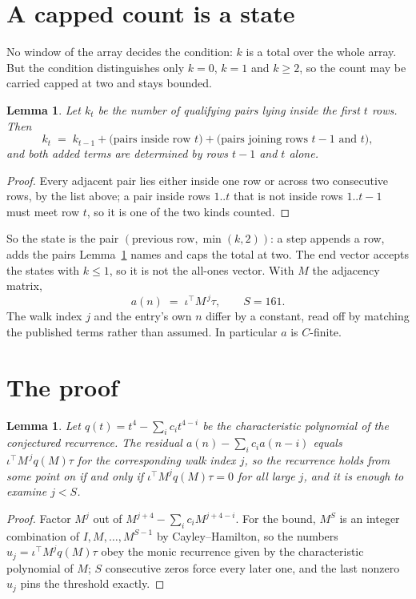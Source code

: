 \documentclass[11pt,a4paper]{article}
\theoremstyle{plain}
\newtheorem{lemma}[theorem]{Lemma}
\theoremstyle{definition}
\begin{document}
\section{A capped count is a state}

No window of the array decides the condition: $k$ is a total over the whole array. But the
condition distinguishes only $k=0$, $k=1$ and $k\ge2$, so the count may be carried capped at
two and stays bounded.

\begin{lemma}\label{lem:cap}
Let $k_t$ be the number of qualifying pairs lying inside the first $t$ rows. Then
\[
k_{t}\;=\;k_{t-1}+\bigl(\text{pairs inside row } t\bigr)
+\bigl(\text{pairs joining rows } t-1 \text{ and } t\bigr),
\]
and both added terms are determined by rows $t-1$ and $t$ alone.
\end{lemma}

\begin{proof}
Every adjacent pair lies either inside one row or across two consecutive rows, by the list
above; a pair inside rows $1..t$ that is not inside rows $1..t-1$ must meet row $t$, so it is
one of the two kinds counted.
\end{proof}

So the state is the pair $(\text{previous row},\min(k,2))$: a step appends a row, adds the
pairs Lemma~\ref{lem:cap} names and caps the total at two. The end vector accepts the states
with $k\le1$, so it is not the all-ones vector. With $M$ the adjacency matrix,
\[
a(n)\;=\;\iota^{\!\top}M^{\,j}\tau ,\qquad S=161.
\]
The walk index $j$ and the entry's own $n$ differ by a constant, read off by matching the
published terms rather than assumed. In particular $a$ is $C$-finite.

\section{The proof}

\begin{lemma}\label{lem:crit}
Let $q(t)=t^{4}-\sum_i c_it^{4-i}$ be the characteristic polynomial of the
conjectured recurrence. The residual $a(n)-\sum_ic_ia(n-i)$ equals
$\iota^{\!\top}M^{\,j}q(M)\tau$ for the corresponding walk index $j$, so the recurrence
holds from some point on if and only if $\iota^{\!\top}M^{j}q(M)\tau=0$ for all large $j$,
and it is enough to examine $j<S$.
\end{lemma}

\begin{proof}
Factor $M^{j}$ out of $M^{j+4}-\sum_ic_iM^{j+4-i}$. For the bound, $M^{S}$
is an integer combination of $I,M,\dots,M^{S-1}$ by Cayley--Hamilton, so the numbers
$u_j=\iota^{\!\top}M^{j}q(M)\tau$ obey the monic recurrence given by the characteristic
polynomial of $M$; $S$ consecutive zeros force every later one, and the last nonzero $u_j$
pins the threshold exactly.
\end{proof}
\end{document}
